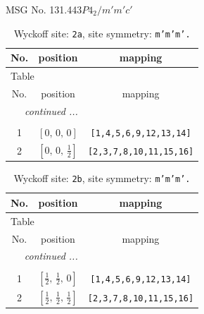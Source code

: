 \documentclass[fleqn,8pt]{jsarticle}
\begin{document}
\setcounter{MaxMatrixCols}{32}

\renewcommand{\tablename}{Table~}
\renewcommand{\figurename}{Figure~}
\begin{center}
\LARGE
MSG No. 131.443\quad$P4_{2}/m'm'c'$
\end{center}
\renewcommand{\arraystretch}{1.2}
\begin{longtable}{ccc}
\caption{Wyckoff site: {\tt 2a}, site symmetry: {\tt m'm'm'.}}
 \\
 \hline \hline
No. & position & mapping \\ \hline \endfirsthead

\multicolumn{2}{l}{\tablename\ \thetable{}} \\
 \hline \hline
No. & position & mapping \\ \hline \endhead

 \hline \hline
\multicolumn{2}{r}{\footnotesize\it continued ...} \\ \endfoot

 \hline \hline
\multicolumn{2}{r}{} \\ \endlastfoot

1 & $\left[ 0,\, 0,\, 0 \right]$ & {\tt [1,4,5,6,9,12,13,14]} \\ \hline
2 & $\left[ 0,\, 0,\, \frac{1}{2} \right]$ & {\tt [2,3,7,8,10,11,15,16]} \\
\end{longtable}
\renewcommand{\arraystretch}{1.2}
\begin{longtable}{ccc}
\caption{Wyckoff site: {\tt 2b}, site symmetry: {\tt m'm'm'.}}
 \\
 \hline \hline
No. & position & mapping \\ \hline \endfirsthead

\multicolumn{2}{l}{\tablename\ \thetable{}} \\
 \hline \hline
No. & position & mapping \\ \hline \endhead

 \hline \hline
\multicolumn{2}{r}{\footnotesize\it continued ...} \\ \endfoot

 \hline \hline
\multicolumn{2}{r}{} \\ \endlastfoot

1 & $\left[ \frac{1}{2},\, \frac{1}{2},\, 0 \right]$ & {\tt [1,4,5,6,9,12,13,14]} \\ \hline
2 & $\left[ \frac{1}{2},\, \frac{1}{2},\, \frac{1}{2} \right]$ & {\tt [2,3,7,8,10,11,15,16]} \\
\end{longtable}
\end{document}
